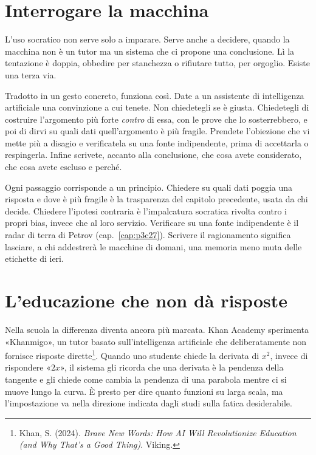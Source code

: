 \section{Interrogare la macchina}

L'uso socratico non serve solo a imparare. Serve anche a decidere, quando la macchina non è un tutor ma un sistema che ci propone una conclusione. Lì la tentazione è doppia, obbedire per stanchezza o rifiutare tutto, per orgoglio. Esiste una terza via.

Tradotto in un gesto concreto, funziona così. Date a un assistente di intelligenza artificiale una convinzione a cui tenete. Non chiedetegli se è giusta. Chiedetegli di costruire l'argomento più forte \textit{contro} di essa, con le prove che lo sosterrebbero, e poi di dirvi su quali dati quell'argomento è più fragile. Prendete l'obiezione che vi mette più a disagio e verificatela su una fonte indipendente, prima di accettarla o respingerla. Infine scrivete, accanto alla conclusione, che cosa avete considerato, che cosa avete escluso e perché.

Ogni passaggio corrisponde a un principio. Chiedere su quali dati poggia una risposta e dove è più fragile è la trasparenza del capitolo precedente, usata da chi decide. Chiedere l'ipotesi contraria è l'impalcatura socratica rivolta contro i propri bias, invece che al loro servizio. Verificare su una fonte indipendente è il radar di terra di Petrov (cap.~\ref{cap:p3c27}). Scrivere il ragionamento significa lasciare, a chi addestrerà le macchine di domani, una memoria meno muta delle etichette di ieri.

\section{L'educazione che non dà risposte}

Nella scuola la differenza diventa ancora più marcata. Khan Academy sperimenta «Khanmigo», un tutor basato sull'intelligenza artificiale che deliberatamente non fornisce risposte dirette\footnote{Khan, S. (2024). \textit{Brave New Words: How AI Will Revolutionize Education (and Why That's a Good Thing)}. Viking.}. Quando uno studente chiede la derivata di $x^2$, invece di rispondere «$2x$», il sistema gli ricorda che una derivata è la pendenza della tangente e gli chiede come cambia la pendenza di una parabola mentre ci si muove lungo la curva. È presto per dire quanto funzioni su larga scala, ma l'impostazione va nella direzione indicata dagli studi sulla fatica desiderabile.

